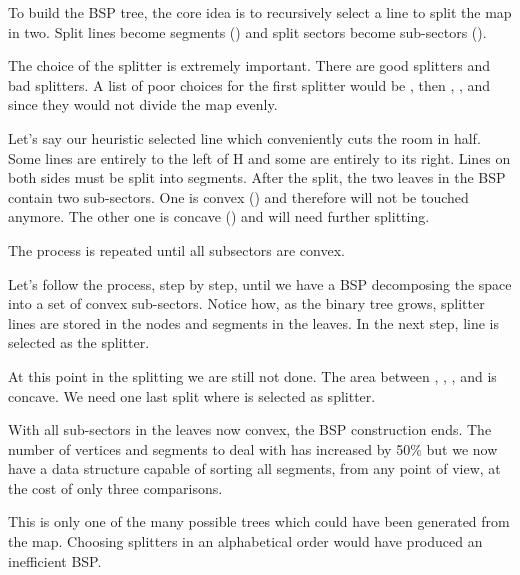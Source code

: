 To build the BSP tree, the core idea is to recursively select a line to split the map in two. Split lines become segments () and split sectors become sub-sectors ().\\  
\par
The choice of the splitter is extremely important. There are good splitters and bad splitters. A list of poor choices for the first splitter would be , then , , and  since they would not divide the map evenly.\\ 
\par
Let's say our heuristic selected line  which conveniently cuts the room in half. Some lines are entirely to the left of H and some are entirely to its right. Lines on both sides must be split into segments.  After the split, the two leaves in the BSP contain two sub-sectors. One is convex () and therefore will not be touched anymore. The other one is concave () and will need further splitting.\\
\par
 The process is repeated until all subsectors are convex.\\
\par
{}
\par

Let's follow the process, step by step, until we have a BSP decomposing the space into a set of convex sub-sectors. Notice how, as the binary tree grows, splitter lines are stored in the nodes and segments in the leaves. In the next step, line  is selected as the splitter.
\par
{}
\par
At this point in the splitting we are still not done. The area between , , , and  is concave. We need one last split where  is selected as splitter.\\ 
\par
{}
\par
With all sub-sectors in the leaves now convex, the BSP construction ends. The number of vertices and segments to deal with has increased by 50\% but we now have a data structure capable of sorting all segments, from any point of view, at the cost of only three comparisons.\\
\par
This is only one of the many possible trees which could have been generated from the map. Choosing splitters in an alphabetical order would have produced an inefficient BSP.\\




